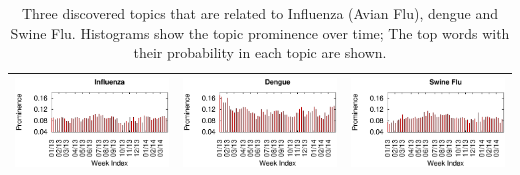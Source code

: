 \documentclass[conference]{IEEEtran}
\begin{document}
\begin{table}[t]
\begin{center}
\caption{Three discovered topics that are related to Influenza (Avian Flu), dengue and Swine Flu. Histograms show the topic prominence over time; The top words with their probability in each topic are shown.}
\begin{tabular}{|lr|lr|lr|}
\hline
\multicolumn{2}{|c|}{\includegraphics[clip,scale=0.45]{fig/topic_influenza_timeline.eps}} & \multicolumn{2}{|c|}{\includegraphics[clip,scale=0.45]{fig/topic_dengue_timeline.eps}}& 
\multicolumn{2}{|c|}{\includegraphics[clip,scale=0.45]{fig/topic_swine_timeline.eps}} \\ \hline

\end{tabular}
\end{center}
\end{table}
\end{document}
